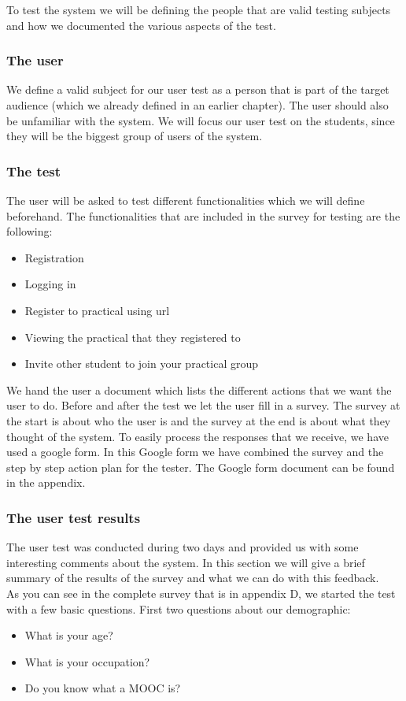 To test the system we will be defining the people that are valid testing subjects and how we documented the various aspects of the test.

\subsubsection{The user}
We define a valid subject for our user test as a person that is part of the target audience (which we already defined in an earlier chapter).
The user should also be unfamiliar with the system.
We will focus our user test on the students, since they will be the biggest group of users of the system.

\subsubsection{The test}
The user will be asked to test different functionalities which we will define beforehand.
The functionalities that are included in the survey for testing are the following:
\begin{itemize}
\item Registration
\item Logging in
\item Register to practical using url
\item Viewing the practical that they registered to
\item Invite other student to join your practical group
\end{itemize}
We hand the user a document which lists the different actions that we want the user to do.
Before and after the test we let the user fill in a survey.
The survey at the start is about who the user is and the survey at the end is about what they thought of the system.
To easily process the responses that we receive, we have used a google form.
In this Google form we have combined the survey and the step by step action plan for the tester.
The Google form document can be found in the appendix.

\subsubsection{The user test results}
The user test was conducted during two days and provided us with some interesting comments about the system.
In this section we will give a brief summary of the results of the survey and what we can do with this feedback.\\

As you can see in the complete survey that is in appendix D, we started the test with a few basic questions.
First two questions about our demographic:
\begin{itemize}
\item What is your age?
\item What is your occupation?
\item Do you know what a MOOC is?
\end{itemize}

